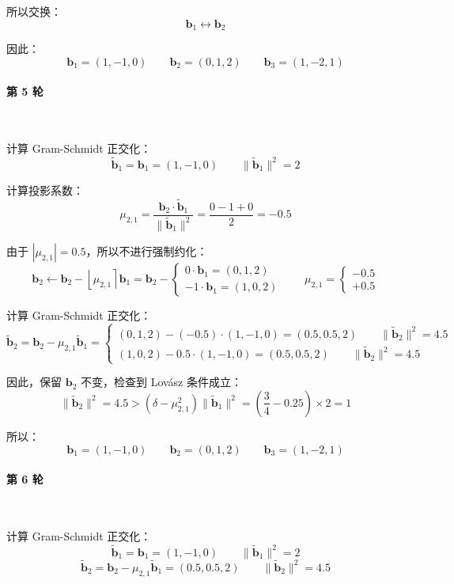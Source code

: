 \documentclass{article}
\begin{document}
所以交换：
\[ \bm{b}_1\leftrightarrow\bm{b}_2 \]

因此：
\[ \bm{b}_1=(1,-1,0)\qquad\bm{b}_2=(0,1,2)\qquad\bm{b}_3=(1,-2,1) \]



\paragraph*{第 5 轮}~{}

计算 Gram-Schmidt 正交化：
\[ \tilde{\bm{b}}_1=\bm{b}_1=(1,-1,0)\qquad \|\tilde{\bm{b}}_1\|^2=2 \]

计算投影系数：
\[ \mu_{2,1}=\dfrac{\bm{b}_2\cdot\tilde{\bm{b}}_1}{\|\tilde{\bm{b}}_1\|^2}=\dfrac{0-1+0}{2}=-0.5 \]

由于 $|\mu_{2,1}|=0.5$，所以不进行强制约化：
\[ \bm{b}_2\leftarrow\bm{b}_2-\left\lfloor\mu_{2,1}\right\rceil\bm{b}_1=\bm{b}_2-\begin{cases}
    0\cdot\bm{b}_1=(0,1,2)
    \\[7pt]
    -1\cdot\bm{b}_1=(1,0,2)
\end{cases}\qquad\mu_{2,1}=\begin{cases}
    -0.5
    \\[7pt]
    +0.5
\end{cases} \]

计算 Gram-Schmidt 正交化：
\[ \tilde{\bm{b}}_2=\bm{b}_2-\mu_{2,1}\tilde{\bm{b}}_1=\begin{cases}
    (0,1,2)-(-0.5)\cdot(1,-1,0)=(0.5,0.5,2)\qquad\|\tilde{\bm{b}}_2\|^2=4.5
    \\[7pt]
    (1,0,2)-0.5\cdot(1,-1,0)=(0.5,0.5,2)\qquad\|\tilde{\bm{b}}_2\|^2=4.5
\end{cases} \]

因此，保留 $\bm{b}_2$ 不变，检查到 Lov\'asz 条件成立：
\[ \|\tilde{\bm{b}}_{2}\|^2=4.5>(\delta-\mu_{2,1}^2)\|\tilde{\bm{b}}_{1}\|^2=\left(\dfrac{3}{4}-0.25\right)\times2=1 \]

所以：
\[ \bm{b}_1=(1,-1,0)\qquad\bm{b}_2=(0,1,2)\qquad\bm{b}_3=(1,-2,1) \]



\paragraph*{第 6 轮}~{}

计算 Gram-Schmidt 正交化：
\[ \tilde{\bm{b}}_1=\bm{b}_1=(1,-1,0)\qquad \|\tilde{\bm{b}}_1\|^2=2 \]
\[ \tilde{\bm{b}}_2=\bm{b}_2-\mu_{2,1}\tilde{\bm{b}}_1=(0.5,0.5,2)\qquad\|\tilde{\bm{b}}_2\|^2=4.5 \]
\end{document}
